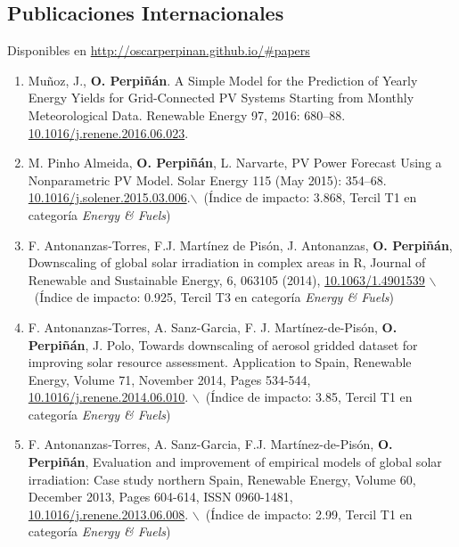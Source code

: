\documentclass[article, a4paper]{memoir}
\begin{document}
\subsection{Publicaciones Internacionales}
\label{sec:org9153c72}
Disponibles en \url{http://oscarperpinan.github.io/\#papers}

\begin{enumerate}
\item Muñoz, J., \textbf{O. Perpiñán}. A Simple Model for the Prediction of Yearly Energy Yields for Grid-Connected PV Systems Starting from Monthly Meteorological Data. Renewable Energy 97, 2016: 680–88. \href{http://dx.doi.org/10.1016/j.renene.2016.06.023}{10.1016/j.renene.2016.06.023}.

\item M. Pinho Almeida, \textbf{O. Perpiñán}, L. Narvarte, PV Power Forecast Using a Nonparametric PV Model. Solar Energy 115 (May 2015): 354–68. \href{http://dx.doi.org/10.1016/j.solener.2015.03.006}{10.1016/j.solener.2015.03.006}.$\backslash$\ (Índice de impacto: 3.868, Tercil T1 en categoría \emph{Energy \& Fuels})

\item F. Antonanzas-Torres, F.J. Martínez de Pisón, J. Antonanzas, \textbf{O. Perpiñán}, Downscaling of global solar irradiation in complex areas in R, Journal of Renewable and Sustainable Energy, 6, 063105 (2014), \href{http://dx.doi.org/10.1063/1.4901539}{10.1063/1.4901539} $\backslash$\ (Índice de impacto: 0.925, Tercil T3 en categoría \emph{Energy \& Fuels})

\item F. Antonanzas-Torres, A. Sanz-Garcia, F. J. Martínez-de-Pisón, \textbf{O. Perpiñán}, J. Polo, Towards downscaling of aerosol gridded dataset for improving solar resource assessment. Application to Spain, Renewable Energy, Volume 71, November 2014, Pages 534-544, \href{http://dx.doi.org/10.1016/j.renene.2014.06.010}{10.1016/j.renene.2014.06.010}. $\backslash$\ (Índice de impacto: 3.85, Tercil T1 en categoría \emph{Energy \& Fuels})

\item F. Antonanzas-Torres, A. Sanz-Garcia, F.J. Martínez-de-Pisón, \textbf{O. Perpiñán}, Evaluation and improvement of empirical models of global solar irradiation: Case study northern Spain, Renewable Energy, Volume 60, December 2013, Pages 604-614, ISSN 0960-1481, \href{http://dx.doi.org/10.1016/j.renene.2013.06.008}{10.1016/j.renene.2013.06.008}. $\backslash$\ (Índice de impacto: 2.99, Tercil T1 en categoría \emph{Energy \& Fuels})


\end{enumerate}
\end{document}
